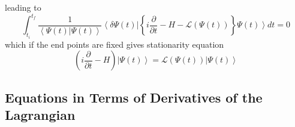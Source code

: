 \documentclass[aps,preprint]{revtex4}
\begin{document}
leading to 
\begin{equation}
\int_{t_{i}}^{t_{f}}\frac{1}{\left\langle \Psi \left( t\right) |\Psi \left(
t\right) \right\rangle }\left\langle \delta \Psi \left( t\right) \right\vert
\left\{ i\frac{\partial }{\partial t}-H-\mathcal{L}\left( \Psi \left(
t\right) \right) \right\} \left. \Psi \left( t\right) \right\rangle dt=0
\end{equation}%
which if the end points are fixed gives stationarity equation 
\begin{equation}
\left( i\frac{\partial }{\partial t}-H\right) \left\vert \Psi \left(
t\right) \right\rangle =\mathcal{L}\left( \Psi \left( t\right) \right)
\left\vert \Psi \left( t\right) \right\rangle  \label{c2}
\end{equation}

\subsection{Equations in Terms of Derivatives of the Lagrangian}
\end{document}
